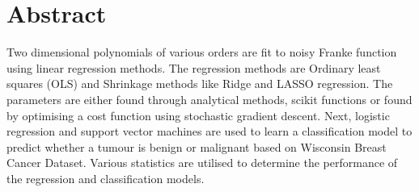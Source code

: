 \section*{Abstract} \label{sec:abstract}

Two dimensional polynomials of various orders are fit to noisy Franke function using linear regression methods. The regression methods are Ordinary least squares (OLS) and Shrinkage methods like Ridge and LASSO regression. The parameters are either found through analytical methods, scikit functions or found by optimising a cost function using stochastic gradient descent. Next, logistic regression and support vector machines are used to learn a classification model to predict whether a tumour is benign or malignant based on Wisconsin Breast Cancer Dataset. Various statistics are utilised to determine the performance of the regression and classification models. 